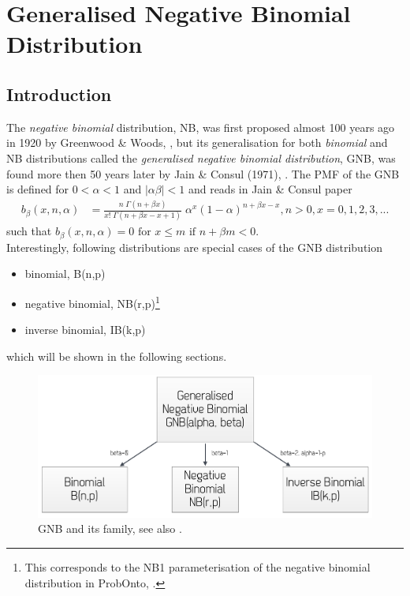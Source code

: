 \newpage
\section{Generalised Negative Binomial Distribution}
\subsection*{Introduction}
The \emph{negative binomial} distribution, NB, was first proposed almost 
100 years ago in 1920 by Greenwood \& Woods, \cite{greenwood1920inquiry}, 
but its generalisation for both \emph{binomial} and NB distributions called the 
\emph{generalised negative binomial distribution}, GNB, was found 
more then 50 years later by Jain \& Consul (1971), \cite{jain1971generalized}. 
The PMF of the GNB is defined for $0<\alpha<1$ and $|\alpha \beta| < 1$ 
and reads in Jain \& Consul paper
\begin{align*}
b_{\beta}(x,n,\alpha) &= 
\frac{n \; \Gamma(n+\beta x)}{x! \;\Gamma(n + \beta x - x +1)}  \; \alpha^x (1-\alpha)^{n+\beta x-x}, n>0, x=0,1,2,3,...
\end{align*}
such that $b_{\beta}(x,n,\alpha) = 0 \text{ for } x \leq m \text{ if } n+\beta m < 0.$\\
Interestingly, following distributions are special cases of the GNB distribution
\begin{itemize}
\item 
binomial, B(n,p)
\item 
negative binomial, NB(r,p)\footnote{This corresponds to the NB1 parameterisation 
of the negative binomial distribution in ProbOnto, \cite{Swat:2015a}.}
\item 
inverse binomial, IB(k,p)
\end{itemize}
which will be shown in the following sections. 

\begin{figure}[ht!]
\centering
  \includegraphics[width=120mm]{pics/GNBspecialCases.pdf}
 \caption{GNB and its family, see also \cite{Consul:2006qf}.}
 \label{fig:GNBspecialCases}
\end{figure}


